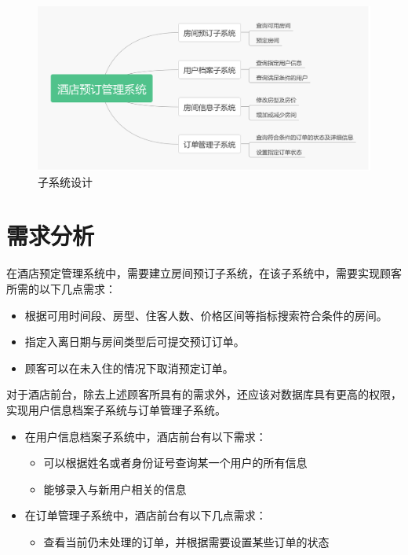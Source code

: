 \documentclass{myreport}
\begin{document}
\begin{figure}[htp]
    \centering
    \includegraphics[width=15cm]{figure/2018-12-15-19-12-55.png}
    \caption{子系统设计}
    \label{fig:sub-system-design}
\end{figure}



\section{需求分析}

在酒店预定管理系统中，需要建立房间预订子系统，在该子系统中，需要实现顾客所需的以下几点需求：

\begin{itemize}
    \item 根据可用时间段、房型、住客人数、价格区间等指标搜索符合条件的房间。
    \item 指定入离日期与房间类型后可提交预订订单。
    \item 顾客可以在未入住的情况下取消预定订单。
\end{itemize}

对于酒店前台，除去上述顾客所具有的需求外，还应该对数据库具有更高的权限，实现用户信息档案子系统与订单管理子系统。

\begin{itemize}
    \item 在用户信息档案子系统中，酒店前台有以下需求：
    \begin{itemize}
        \item 可以根据姓名或者身份证号查询某一个用户的所有信息
        \item 能够录入与新用户相关的信息
    \end{itemize}
    \item 在订单管理子系统中，酒店前台有以下几点需求：
    \begin{itemize}
        \item 查看当前仍未处理的订单，并根据需要设置某些订单的状态
    \end{itemize}
\end{itemize}
\end{document}
